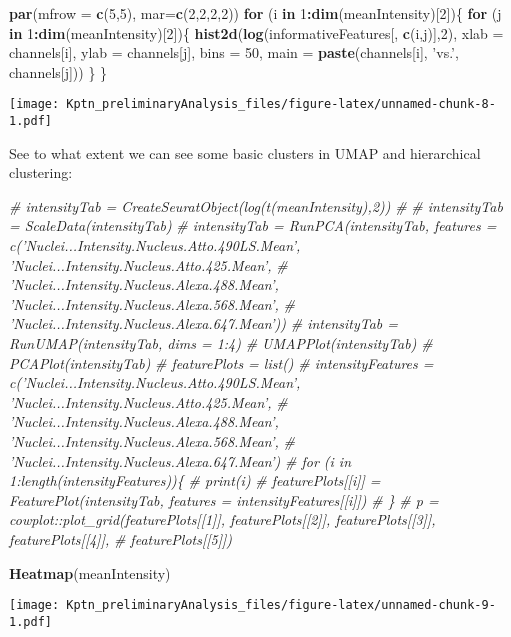 \documentclass[]{article}
\newenvironment{Shaded}{\begin{snugshade}}{\end{snugshade}}
\newcommand{\CommentTok}[1]{\textcolor[rgb]{0.56,0.35,0.01}{\textit{#1}}}
\newcommand{\ControlFlowTok}[1]{\textcolor[rgb]{0.13,0.29,0.53}{\textbf{#1}}}
\newcommand{\DataTypeTok}[1]{\textcolor[rgb]{0.13,0.29,0.53}{#1}}
\newcommand{\DecValTok}[1]{\textcolor[rgb]{0.00,0.00,0.81}{#1}}
\newcommand{\KeywordTok}[1]{\textcolor[rgb]{0.13,0.29,0.53}{\textbf{#1}}}
\newcommand{\NormalTok}[1]{#1}
\newcommand{\OperatorTok}[1]{\textcolor[rgb]{0.81,0.36,0.00}{\textbf{#1}}}
\newcommand{\StringTok}[1]{\textcolor[rgb]{0.31,0.60,0.02}{#1}}
\begin{document}
\begin{Shaded}
\begin{Highlighting}[]
\KeywordTok{par}\NormalTok{(}\DataTypeTok{mfrow =} \KeywordTok{c}\NormalTok{(}\DecValTok{5}\NormalTok{,}\DecValTok{5}\NormalTok{), }\DataTypeTok{mar=}\KeywordTok{c}\NormalTok{(}\DecValTok{2}\NormalTok{,}\DecValTok{2}\NormalTok{,}\DecValTok{2}\NormalTok{,}\DecValTok{2}\NormalTok{))}
\ControlFlowTok{for}\NormalTok{ (i }\ControlFlowTok{in} \DecValTok{1}\OperatorTok{:}\KeywordTok{dim}\NormalTok{(meanIntensity)[}\DecValTok{2}\NormalTok{])\{}
  \ControlFlowTok{for}\NormalTok{ (j }\ControlFlowTok{in} \DecValTok{1}\OperatorTok{:}\KeywordTok{dim}\NormalTok{(meanIntensity)[}\DecValTok{2}\NormalTok{])\{}
    \KeywordTok{hist2d}\NormalTok{(}\KeywordTok{log}\NormalTok{(informativeFeatures[, }\KeywordTok{c}\NormalTok{(i,j)],}\DecValTok{2}\NormalTok{), }\DataTypeTok{xlab =}\NormalTok{ channels[i], }\DataTypeTok{ylab =}\NormalTok{ channels[j], }\DataTypeTok{bins =} \DecValTok{50}\NormalTok{,}
           \DataTypeTok{main =} \KeywordTok{paste}\NormalTok{(channels[i], }\StringTok{'vs.'}\NormalTok{, channels[j]))}
\NormalTok{  \}}
\NormalTok{\}}
\end{Highlighting}
\end{Shaded}

\texttt{[image: Kptn\_preliminaryAnalysis\_files/figure-latex/unnamed-chunk-8-1.pdf]}

See to what extent we can see some basic clusters in UMAP and
hierarchical clustering:

\begin{Shaded}
\begin{Highlighting}[]
\CommentTok{# intensityTab = CreateSeuratObject(log(t(meanIntensity),2))}
\CommentTok{# }
\CommentTok{# intensityTab = ScaleData(intensityTab)}
\CommentTok{# intensityTab = RunPCA(intensityTab, features = c('Nuclei...Intensity.Nucleus.Atto.490LS.Mean', 'Nuclei...Intensity.Nucleus.Atto.425.Mean',}
\CommentTok{#                          'Nuclei...Intensity.Nucleus.Alexa.488.Mean', 'Nuclei...Intensity.Nucleus.Alexa.568.Mean',}
\CommentTok{#                          'Nuclei...Intensity.Nucleus.Alexa.647.Mean'))}
\CommentTok{# intensityTab = RunUMAP(intensityTab, dims = 1:4)}
\CommentTok{# UMAPPlot(intensityTab)}
\CommentTok{# PCAPlot(intensityTab)}
\CommentTok{# featurePlots = list()}
\CommentTok{# intensityFeatures = c('Nuclei...Intensity.Nucleus.Atto.490LS.Mean', 'Nuclei...Intensity.Nucleus.Atto.425.Mean',}
\CommentTok{#                          'Nuclei...Intensity.Nucleus.Alexa.488.Mean', 'Nuclei...Intensity.Nucleus.Alexa.568.Mean',}
\CommentTok{#                          'Nuclei...Intensity.Nucleus.Alexa.647.Mean')}
\CommentTok{# for (i in 1:length(intensityFeatures))\{}
\CommentTok{#   print(i)}
\CommentTok{#   featurePlots[[i]] = FeaturePlot(intensityTab, features = intensityFeatures[[i]])}
\CommentTok{# \}}
\CommentTok{# p = cowplot::plot_grid(featurePlots[[1]], featurePlots[[2]], featurePlots[[3]], featurePlots[[4]], }
\CommentTok{#                        featurePlots[[5]])}


\KeywordTok{Heatmap}\NormalTok{(meanIntensity)}
\end{Highlighting}
\end{Shaded}

\texttt{[image: Kptn\_preliminaryAnalysis\_files/figure-latex/unnamed-chunk-9-1.pdf]}
\end{document}
